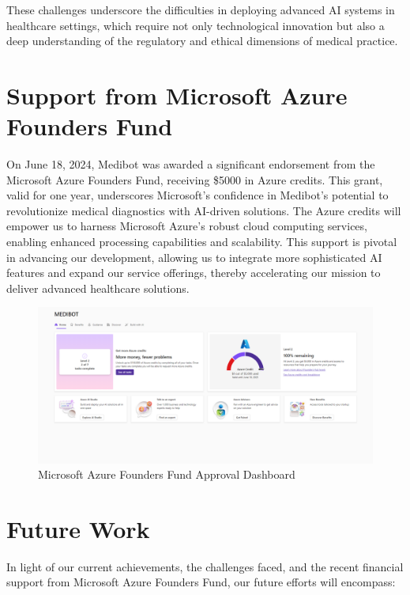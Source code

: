 These challenges underscore the difficulties in deploying advanced AI systems in healthcare settings, which require not only technological innovation but also a deep understanding of the regulatory and ethical dimensions of medical practice.

\section{Support from Microsoft Azure Founders Fund}
On June 18, 2024, Medibot was awarded a significant endorsement from the Microsoft Azure Founders Fund, receiving \$5000 in Azure credits. This grant, valid for one year, underscores Microsoft's confidence in Medibot's potential to revolutionize medical diagnostics with AI-driven solutions. The Azure credits will empower us to harness Microsoft Azure's robust cloud computing services, enabling enhanced processing capabilities and scalability. This support is pivotal in advancing our development, allowing us to integrate more sophisticated AI features and expand our service offerings, thereby accelerating our mission to deliver advanced healthcare solutions.

\begin{figure}[H]
    \centering
    \includegraphics[width=\textwidth]{./Figures/azurefund.png}
    \caption{Microsoft Azure Founders Fund Approval Dashboard}
    \label{fig:azure_fund}
\end{figure}

\section{Future Work}
In light of our current achievements, the challenges faced, and the recent financial support from Microsoft Azure Founders Fund, our future efforts will encompass:

